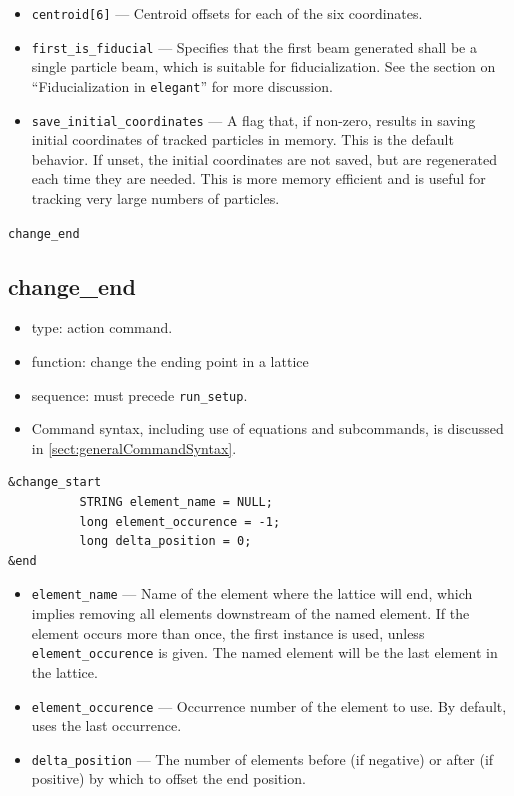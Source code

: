 \documentclass[11pt]{article}
\begin{document}
\begin{itemize}
\item \verb|centroid[6]| --- Centroid offsets for each of the six coordinates.

\item \verb|first_is_fiducial| --- Specifies that the first beam
generated shall be a single particle beam, which is suitable for
fiducialization.  See the section on ``Fiducialization in
\verb|elegant|'' for more discussion.

\item \verb|save_initial_coordinates| --- A flag that, if non-zero, results
in saving initial coordinates of tracked particles in memory.  This is
the default behavior.  If unset, the initial coordinates are not
saved, but are regenerated each time they are needed.  This is more
memory efficient and is useful for tracking very large numbers of
particles.
\end{itemize}

\newpage
\begin{center}{\Large\verb|change_end|}\end{center}
\subsection{change\_end\label{subsec:changeend}}

\begin{itemize}
\item type: action command.
\item function: change the ending point in a lattice
\item sequence: must precede \verb|run_setup|.
\item Command syntax, including use of equations and subcommands, is discussed in \ref{sect:generalCommandSyntax}.
\end{itemize}

\begin{verbatim}
&change_start
          STRING element_name = NULL;
          long element_occurence = -1;
          long delta_position = 0;
&end
\end{verbatim}

\begin{itemize}
\item \verb|element_name| --- Name of the element where the lattice will end,  which implies removing all 
  elements downstream of the named element. If the element occurs more than once, the first instance is used, unless
  \verb|element_occurence| is given. The named element will be the last element in the lattice.
\item \verb|element_occurence| --- Occurrence number of the element to use. By default, uses the last occurrence.
\item \verb|delta_position| --- The number of elements before (if negative) or after (if positive) by which to
  offset the end position.
\end{itemize}
\end{document}
